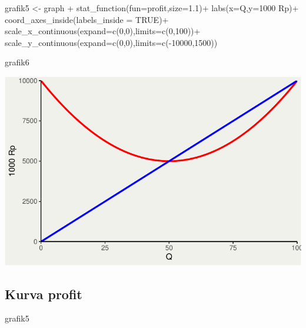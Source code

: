 \documentclass[
  letterpaper,
  DIV=11,
  numbers=noendperiod]{scrartcl}
\newenvironment{Shaded}{\begin{snugshade}}{\end{snugshade}}
\newcommand{\AttributeTok}[1]{\textcolor[rgb]{0.40,0.45,0.13}{#1}}
\newcommand{\ConstantTok}[1]{\textcolor[rgb]{0.56,0.35,0.01}{#1}}
\newcommand{\DecValTok}[1]{\textcolor[rgb]{0.68,0.00,0.00}{#1}}
\newcommand{\FloatTok}[1]{\textcolor[rgb]{0.68,0.00,0.00}{#1}}
\newcommand{\FunctionTok}[1]{\textcolor[rgb]{0.28,0.35,0.67}{#1}}
\newcommand{\NormalTok}[1]{\textcolor[rgb]{0.00,0.23,0.31}{#1}}
\newcommand{\OtherTok}[1]{\textcolor[rgb]{0.00,0.23,0.31}{#1}}
\newcommand{\SpecialCharTok}[1]{\textcolor[rgb]{0.37,0.37,0.37}{#1}}
\newcommand{\StringTok}[1]{\textcolor[rgb]{0.13,0.47,0.30}{#1}}
\begin{document}
\begin{Shaded}
\begin{Highlighting}[]
\NormalTok{grafik5 }\OtherTok{\textless{}{-}}\NormalTok{ graph }\SpecialCharTok{+}
  \FunctionTok{stat\_function}\NormalTok{(}\AttributeTok{fun=}\NormalTok{profit,}\AttributeTok{size=}\FloatTok{1.1}\NormalTok{)}\SpecialCharTok{+}
  \FunctionTok{labs}\NormalTok{(}\AttributeTok{x=}\StringTok{\textquotesingle{}Q\textquotesingle{}}\NormalTok{,}\AttributeTok{y=}\StringTok{\textquotesingle{}1000 Rp\textquotesingle{}}\NormalTok{)}\SpecialCharTok{+}
  \FunctionTok{coord\_axes\_inside}\NormalTok{(}\AttributeTok{labels\_inside =} \ConstantTok{TRUE}\NormalTok{)}\SpecialCharTok{+}
  \FunctionTok{scale\_x\_continuous}\NormalTok{(}\AttributeTok{expand=}\FunctionTok{c}\NormalTok{(}\DecValTok{0}\NormalTok{,}\DecValTok{0}\NormalTok{),}\AttributeTok{limits=}\FunctionTok{c}\NormalTok{(}\DecValTok{0}\NormalTok{,}\DecValTok{100}\NormalTok{))}\SpecialCharTok{+}
  \FunctionTok{scale\_y\_continuous}\NormalTok{(}\AttributeTok{expand=}\FunctionTok{c}\NormalTok{(}\DecValTok{0}\NormalTok{,}\DecValTok{0}\NormalTok{),}\AttributeTok{limits=}\FunctionTok{c}\NormalTok{(}\SpecialCharTok{{-}}\DecValTok{10000}\NormalTok{,}\DecValTok{1500}\NormalTok{))}

\NormalTok{grafik6}
\end{Highlighting}
\end{Shaded}

\includegraphics{index_files/figure-pdf/unnamed-chunk-9-1.pdf}

\subsection{Kurva profit}\label{kurva-profit}

\begin{Shaded}
\begin{Highlighting}[]
\NormalTok{grafik5}
\end{Highlighting}
\end{Shaded}
\end{document}
